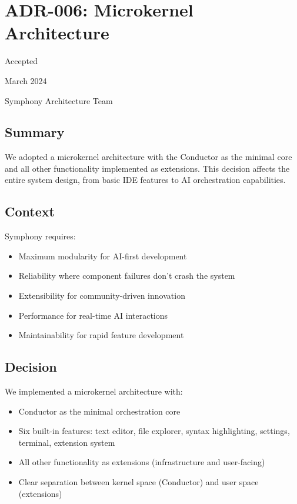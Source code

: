 \section*{ADR-006: Microkernel Architecture}

\begin{description}[leftmargin=3cm,labelwidth=2.5cm]
\item[\textbf{Status}] Accepted
\item[\textbf{Date}] March 2024
\item[\textbf{Authors}] Symphony Architecture Team
\end{description}

\subsection*{Summary}

We adopted a microkernel architecture with the Conductor as the minimal core and all other functionality implemented as extensions. This decision affects the entire system design, from basic IDE features to AI orchestration capabilities.

\subsection*{Context}

Symphony requires:
\begin{itemize}
\item Maximum modularity for AI-first development
\item Reliability where component failures don't crash the system
\item Extensibility for community-driven innovation
\item Performance for real-time AI interactions
\item Maintainability for rapid feature development
\end{itemize}

\subsection*{Decision}

We implemented a microkernel architecture with:
\begin{itemize}
\item Conductor as the minimal orchestration core
\item Six built-in features: text editor, file explorer, syntax highlighting, settings, terminal, extension system
\item All other functionality as extensions (infrastructure and user-facing)
\item Clear separation between kernel space (Conductor) and user space (extensions)
\end{itemize}

